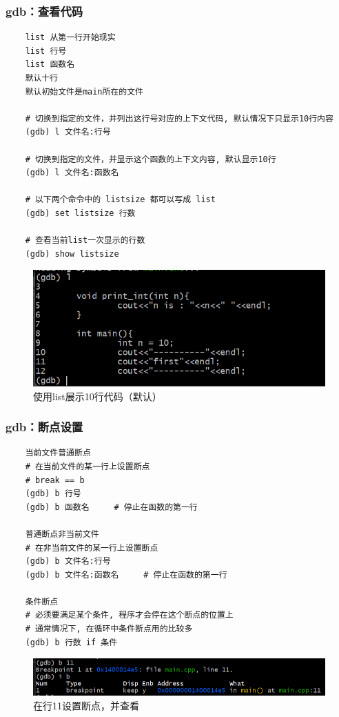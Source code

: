 \documentclass[UTF8]{ctexart}
\begin{document}
\subsubsection{gdb：查看代码}
\begin{verbatim}
	list 从第一行开始现实
	list 行号
	list 函数名
	默认十行
	默认初始文件是main所在的文件
	
	# 切换到指定的文件，并列出这行号对应的上下文代码, 默认情况下只显示10行内容
	(gdb) l 文件名:行号

	# 切换到指定的文件，并显示这个函数的上下文内容, 默认显示10行
	(gdb) l 文件名:函数名

	# 以下两个命令中的 listsize 都可以写成 list
	(gdb) set listsize 行数

	# 查看当前list一次显示的行数
	(gdb) show listsize
\end{verbatim}
\begin{figure}[H]
	\centering
	\includegraphics[width=0.7\linewidth]{figure/gdb_list.png}	
	\caption{使用list展示10行代码（默认）}
\end{figure}

\subsubsection{gdb：断点设置}
\begin{verbatim}
	当前文件普通断点
	# 在当前文件的某一行上设置断点
	# break == b
	(gdb) b 行号
	(gdb) b 函数名		# 停止在函数的第一行

	普通断点非当前文件
	# 在非当前文件的某一行上设置断点
	(gdb) b 文件名:行号
	(gdb) b 文件名:函数名		# 停止在函数的第一行

	条件断点
	# 必须要满足某个条件, 程序才会停在这个断点的位置上
	# 通常情况下, 在循环中条件断点用的比较多
	(gdb) b 行数 if 条件
\end{verbatim}
\begin{figure}[H]
	\centering
	\includegraphics[width=0.7\linewidth]{figure/gdb_b.png}
	\caption{在行11设置断点，并查看}	
\end{figure}
\end{document}
